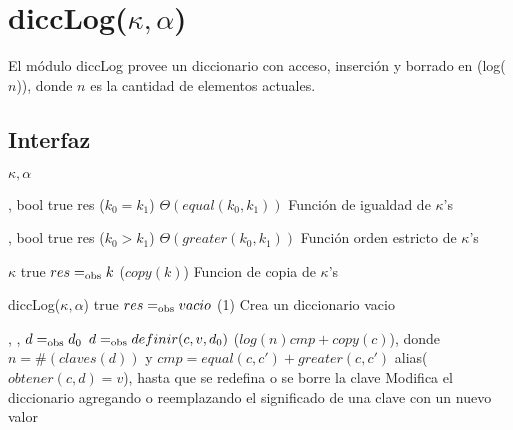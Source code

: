 \section{diccLog($\kappa, \alpha$)}

El módulo diccLog provee un diccionario con acceso, inserción y borrado en \bigo(log($n$)), donde $n$ es la cantidad de elementos actuales.

\subsection{Interfaz}

\begin{iparamformales}{$\kappa, \alpha$}

    \funcion{$\bullet = \bullet$} %
        {, } %
        {bool} %
        {true} %
        {res \igobs ($k_0 = k_1$)} %
        {$\Theta(equal(k_0, k_1))$} %
        {} %
        {Función de igualdad de $\kappa$'s} %

    \funcion{$\bullet > \bullet$} %
        {, } %
        {bool} %
        {true} %
        {res \igobs ($k_0 > k_1$)} %
        {$\Theta(greater(k_0, k_1))$} %
        {} %
        {Función orden estricto de $\kappa$'s} %

        {}
        {$\kappa$}
        {true}
        {$res =_{\mathrm{obs}} k$}
        {\bigo($copy(k)$)}
        {}
        {Funcion de copia de $\kappa$'s}


\end{iparamformales}


\ioperaciones

{}
{diccLog($\kappa, \alpha$)}
{true}
{$res =_{\mathrm{obs}} vacio$}
{\bigo(1)}
{}
{Crea un diccionario vacio}

{   ,
    ,
    }
{}
{$d =_{\mathrm{obs}} d_0$}
{$d =_{\mathrm{obs}} definir(c, v, d_0)$}
{\bigo($log(n)cmp + copy(c)$), donde $n = \#(claves(d))$ y $cmp = equal(c, c')+greater(c, c')$}
{alias($obtener(c, d) = v$), hasta que se redefina o se borre la clave}
{Modifica el diccionario agregando o reemplazando el significado de una clave 
    con un nuevo valor}

